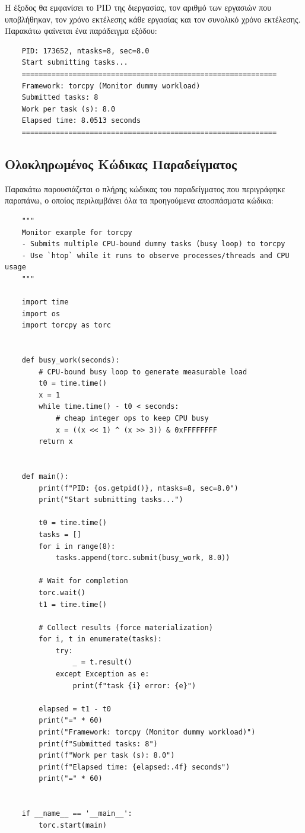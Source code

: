 Η έξοδος θα εμφανίσει το PID της διεργασίας, τον αριθμό των εργασιών που υποβλήθηκαν, τον χρόνο εκτέλεσης κάθε εργασίας και τον συνολικό χρόνο εκτέλεσης. Παρακάτω φαίνεται ένα παράδειγμα εξόδου:

\begin{verbatim}
    PID: 173652, ntasks=8, sec=8.0
    Start submitting tasks...
    ============================================================
    Framework: torcpy (Monitor dummy workload)
    Submitted tasks: 8
    Work per task (s): 8.0
    Elapsed time: 8.0513 seconds
    ============================================================
\end{verbatim}

\subsection{Ολοκληρωμένος Κώδικας Παραδείγματος}

Παρακάτω παρουσιάζεται ο πλήρης κώδικας του παραδείγματος που περιγράφηκε παραπάνω, ο οποίος περιλαμβάνει όλα τα προηγούμενα αποσπάσματα κώδικα:

\begin{verbatim}
    """
    Monitor example for torcpy
    - Submits multiple CPU-bound dummy tasks (busy loop) to torcpy
    - Use `htop` while it runs to observe processes/threads and CPU usage
    """

    import time
    import os
    import torcpy as torc


    def busy_work(seconds):
        # CPU-bound busy loop to generate measurable load
        t0 = time.time()
        x = 1
        while time.time() - t0 < seconds:
            # cheap integer ops to keep CPU busy
            x = ((x << 1) ^ (x >> 3)) & 0xFFFFFFFF
        return x


    def main():
        print(f"PID: {os.getpid()}, ntasks=8, sec=8.0")
        print("Start submitting tasks...")

        t0 = time.time()
        tasks = []
        for i in range(8):
            tasks.append(torc.submit(busy_work, 8.0))

        # Wait for completion
        torc.wait()
        t1 = time.time()

        # Collect results (force materialization)
        for i, t in enumerate(tasks):
            try:
                _ = t.result()
            except Exception as e:
                print(f"task {i} error: {e}")

        elapsed = t1 - t0
        print("=" * 60)
        print("Framework: torcpy (Monitor dummy workload)")
        print(f"Submitted tasks: 8")
        print(f"Work per task (s): 8.0")
        print(f"Elapsed time: {elapsed:.4f} seconds")
        print("=" * 60)


    if __name__ == '__main__':
        torc.start(main)
\end{verbatim}